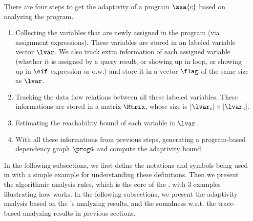 %
%
There are four steps to get the adaptivity of a program $\ssa{c}$ based on analyzing the program. 
\begin{enumerate}
\item Collecting the variables that are newly assigned in the program (via assignment expressions). These variables are stored in an labeled variable vector $\lvar$. 
We also track extra information of each assigned variable (whether it is assigned by a query result, or showing up in loop, or showing up in $\eif$ expression or o.w.) and store it in a vector $\flag$ of the same size as $\lvar$.
%
\item Tracking the data flow relations between all these labeled variables. These informations are stored in a matrix $\Mtrix$, whose size is $|\lvar_c| \times |\lvar_c|$. 
%
\item Estimating the reachability bound of each variable in $\lvar$.
%
\item With all these informations from previous steps, generating a program-based dependency graph $\progG$ and compute the adaptivity bound.
\end{enumerate}

In the following subsections, 
we first define the notations and symbols being used in \THESYSTEM  with a simple example for understanding these definitions. 
Then we present the algorithmic analysis rules, which is the core of the \THESYSTEM, with
3 examples illustrating how \THESYSTEM  works.
In the following subsections, we present the adaptivity analysis based on the \THESYSTEM's analyzing results, and the soundness w.r.t. the trace-based analyzing results in previous sections.

